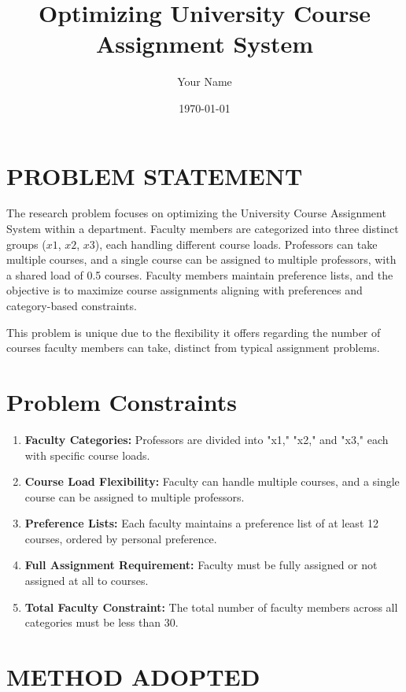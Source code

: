 \documentclass[twoside]{article}
\begin{document}
\title{Optimizing University Course Assignment System}
\author{Your Name}
\date{\today}
\maketitle

\section*{PROBLEM STATEMENT}

The research problem focuses on optimizing the University Course Assignment System within a department. Faculty members are categorized into three distinct groups (\(x1\), \(x2\), \(x3\)), each handling different course loads. Professors can take multiple courses, and a single course can be assigned to multiple professors, with a shared load of 0.5 courses. Faculty members maintain preference lists, and the objective is to maximize course assignments aligning with preferences and category-based constraints.

This problem is unique due to the flexibility it offers regarding the number of courses faculty members can take, distinct from typical assignment problems.

\section*{Problem Constraints}

\begin{enumerate}
    \item \textbf{Faculty Categories:} Professors are divided into "x1," "x2," and "x3," each with specific course loads.
    \item \textbf{Course Load Flexibility:} Faculty can handle multiple courses, and a single course can be assigned to multiple professors.
    \item \textbf{Preference Lists:} Each faculty maintains a preference list of at least 12 courses, ordered by personal preference.
    \item \textbf{Full Assignment Requirement:} Faculty must be fully assigned or not assigned at all to courses.
    \item \textbf{Total Faculty Constraint:} The total number of faculty members across all categories must be less than 30.
\end{enumerate}

\section*{METHOD ADOPTED}
\end{document}
